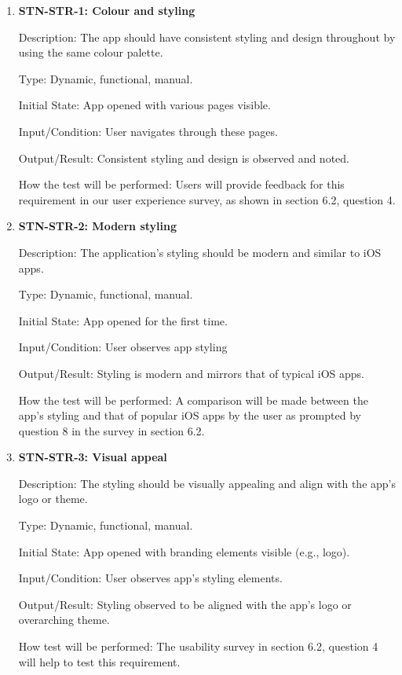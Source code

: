\documentclass[12pt, titlepage]{article}
\begin{document}
    \begin{enumerate}

        \item {\textbf{STN-STR-1: Colour and styling}}

        Description: The app should have consistent styling and design throughout by using the same colour palette.

        Type: Dynamic, functional, manual.

        Initial State: App opened with various pages visible.

        Input/Condition: User navigates through these pages.

        Output/Result: Consistent styling and design is observed and noted.

        How the test will be performed: Users will provide feedback for this requirement in our user experience survey, as shown in section 6.2, question 4.

        \item{\textbf{STN-STR-2: Modern styling}}

        Description: The application’s styling should be modern and similar to iOS apps.

        Type: Dynamic, functional, manual.

        Initial State: App opened for the first time.

        Input/Condition: User observes app styling

        Output/Result: Styling is modern and mirrors that of typical iOS apps.

        How the test will be performed: A comparison will be made between the app's styling and that of popular iOS apps by the user as prompted by question 8 in the survey in section 6.2.


        \item{\textbf{STN-STR-3: Visual appeal}}

        Description: The styling should be visually appealing and align with the app’s logo or theme.

        Type: Dynamic, functional, manual.

        Initial State: App opened with branding elements visible (e.g., logo).

        Input/Condition: User observes app's styling elements.

        Output/Result: Styling observed to be aligned with the app's logo or overarching theme.

        How test will be performed: The usability survey in section 6.2, question 4 will help to test this requirement.

    \end{enumerate}
\end{document}
